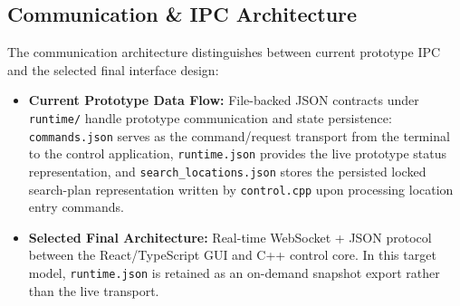 \subsection{Communication \& IPC Architecture}
The communication architecture distinguishes between current prototype IPC and the selected final interface design:
\begin{itemize}
    \item \textbf{Current Prototype Data Flow:} File-backed JSON contracts under \texttt{runtime/} handle prototype communication and state persistence: \texttt{commands.json} serves as the command/request transport from the terminal to the control application, \texttt{runtime.json} provides the live prototype status representation, and \texttt{search\_locations.json} stores the persisted locked search-plan representation written by \texttt{control.cpp} upon processing location entry commands.
    \item \textbf{Selected Final Architecture:} Real-time WebSocket + JSON protocol between the React/TypeScript GUI and C++ control core. In this target model, \texttt{runtime.json} is retained as an on-demand snapshot export rather than the live transport.
\end{itemize}
